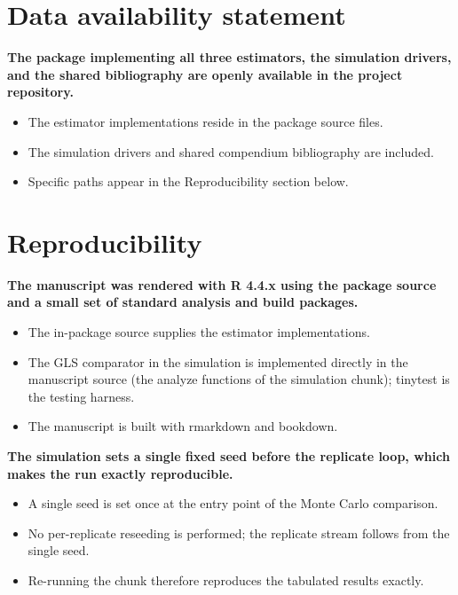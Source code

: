 \documentclass[
  11pt,
]{article}
\begin{document}
\section{Data availability statement}\label{data-availability-statement}

\textbf{The package implementing all three estimators, the simulation drivers, and the shared bibliography are openly available in the project repository.}

\begin{itemize}\setlength{\itemsep}{2pt}\setlength{\parskip}{0pt}
\item The estimator implementations reside in the package source files.
\item The simulation drivers and shared compendium bibliography are included.
\item Specific paths appear in the Reproducibility section below.
\end{itemize}

\section{Reproducibility}\label{reproducibility}

\textbf{The manuscript was rendered with R 4.4.x using the package source and a small set of standard analysis and build packages.}

\begin{itemize}\setlength{\itemsep}{2pt}\setlength{\parskip}{0pt}
\item The in-package source supplies the estimator implementations.
\item The GLS comparator in the simulation is implemented directly in the manuscript source (the analyze functions of the simulation chunk); tinytest is the testing harness.
\item The manuscript is built with rmarkdown and bookdown.
\end{itemize}

\textbf{The simulation sets a single fixed seed before the replicate loop, which makes the run exactly reproducible.}

\begin{itemize}\setlength{\itemsep}{2pt}\setlength{\parskip}{0pt}
\item A single seed is set once at the entry point of the Monte Carlo comparison.
\item No per-replicate reseeding is performed; the replicate stream follows from the single seed.
\item Re-running the chunk therefore reproduces the tabulated results exactly.
\end{itemize}
\end{document}
